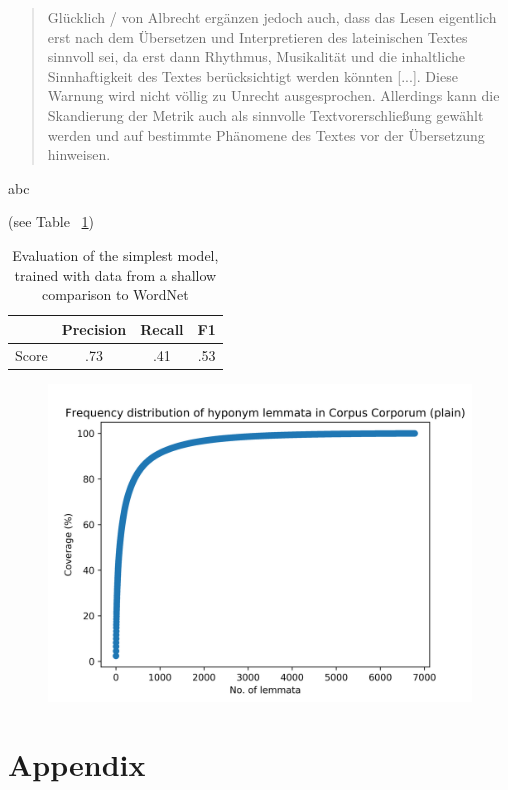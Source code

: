 \documentclass[jou]{apa6} %
\begin{document}
\blockquote[{\cite[p.~243, fn. 89]{munznerNeueWegeIm2013}}]{Glücklich / von Albrecht ergänzen jedoch auch, dass das Lesen eigentlich erst nach dem Übersetzen und Interpretieren des lateinischen Textes sinnvoll sei, da erst dann Rhythmus, Musikalität und die inhaltliche Sinnhaftigkeit des Textes berücksichtigt werden könnten [...]. Diese Warnung wird nicht völlig zu Unrecht ausgesprochen. Allerdings kann die Skandierung der Metrik auch als sinnvolle Textvorerschließung gewählt werden und auf bestimmte Phänomene des Textes vor der Übersetzung hinweisen.}
abc


(see Table ~\ref{table:modelAccuracyShallow})
\begin{table}[ht]
	\begin{tabular}{ c | c | c | c }
  		 & Precision & Recall & F1 \\ \hline
  		Score & .73 & .41 & .53 \\
	\end{tabular}
	\caption{Evaluation of the simplest model, trained with data from a shallow comparison to WordNet}
	\label{table:modelAccuracyShallow}
\end{table}
\begin{figure}[ht]
\includegraphics[width=\linewidth]{freq_dist_hyponyms_cc_plain}
\label{figure:frequencyDistributionHyponymsCCplain}
\end{figure}


\section{Appendix}
\end{document}
